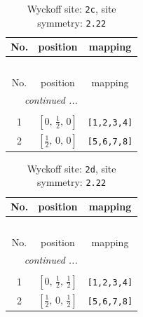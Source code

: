 \documentclass[fleqn,8pt]{jsarticle}
\begin{document}
\renewcommand{\arraystretch}{1.2}
\begin{longtable}{ccc}
\caption{Wyckoff site: {\tt 2c}, site symmetry: {\tt 2.22}}
 \\
 \hline \hline
No. & position & mapping \\ \hline \endfirsthead

\multicolumn{2}{l}{\tablename\ \thetable{}} \\
 \hline \hline
No. & position & mapping \\ \hline \endhead

 \hline \hline
\multicolumn{2}{r}{\footnotesize\it continued ...} \\ \endfoot

 \hline \hline
\multicolumn{2}{r}{} \\ \endlastfoot

1 & $\left[ 0,\, \frac{1}{2},\, 0 \right]$ & {\tt [1,2,3,4]} \\ \hline
2 & $\left[ \frac{1}{2},\, 0,\, 0 \right]$ & {\tt [5,6,7,8]} \\
\end{longtable}
\renewcommand{\arraystretch}{1.2}
\begin{longtable}{ccc}
\caption{Wyckoff site: {\tt 2d}, site symmetry: {\tt 2.22}}
 \\
 \hline \hline
No. & position & mapping \\ \hline \endfirsthead

\multicolumn{2}{l}{\tablename\ \thetable{}} \\
 \hline \hline
No. & position & mapping \\ \hline \endhead

 \hline \hline
\multicolumn{2}{r}{\footnotesize\it continued ...} \\ \endfoot

 \hline \hline
\multicolumn{2}{r}{} \\ \endlastfoot

1 & $\left[ 0,\, \frac{1}{2},\, \frac{1}{2} \right]$ & {\tt [1,2,3,4]} \\ \hline
2 & $\left[ \frac{1}{2},\, 0,\, \frac{1}{2} \right]$ & {\tt [5,6,7,8]} \\
\end{longtable}
\renewcommand{\arraystretch}{1.2}
\end{document}
